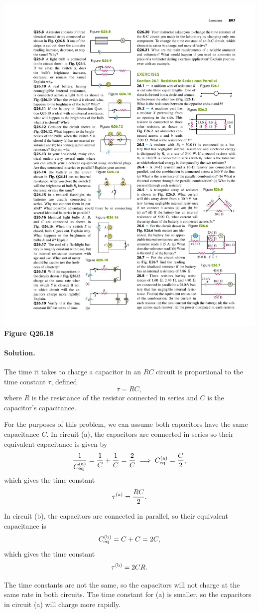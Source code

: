 \documentclass[11pt]{article}
\newcommand{\beq}{\begin{equation*}}
\newcommand{\eeq}{\end{equation*}}
\newcommand{\beqn}{\begin{equation}}
\newcommand{\eeqn}{\end{equation}}
\newenvironment{solution}
{
    \paragraph{Solution.}
    \ignorespaces
}
{
    \bigskip
}
\begin{document}
\begin{minipage}{0.45\textwidth}
{\includegraphics{Q26-18b}}
\center \textbf{Figure Q26.18}
\end{minipage}

\begin{solution}
	The time it takes to charge a capacitor in an $RC$ circuit is proportional to the time constant $\tau$, defined
	\beqn \label{26.14}
		\tau = R C,
	\eeqn
	where $R$ is the resistance of the resistor connected in series and $C$ is the capacitor's capacitance.
	
	For the purposes of this problem, we can assume both capacitors have the same capacitance $C$.  In circuit (a), the capacitors are connected in series so their equivalent capacitance is given by
	\beq
		\frac{1}{\Ceq\ssa} = \frac{1}{C} + \frac{1}{C} = \frac{2}{C}
		\implies
		\Ceq\ssa = \frac{C}{2},
	\eeq
	which gives the time constant
	\beq
		\tau\ssa = \frac{R C}{2}.
	\eeq
	
	In circuit (b), the capacitors are connected in parallel, so their equivalent capacitance is
	\beq
		\Ceq\ssb = C + C = 2C,
	\eeq
	which gives the time constant
	\beq
		\tau\ssb = 2 C R.
	\eeq
	
	The time constants are not the same, so the capacitors will not charge at the same rate in both circuits.  The time constant for (a) is smaller, so the capacitors in circuit (a) will charge more rapidly.
\end{solution}

\vfill
\end{document}
